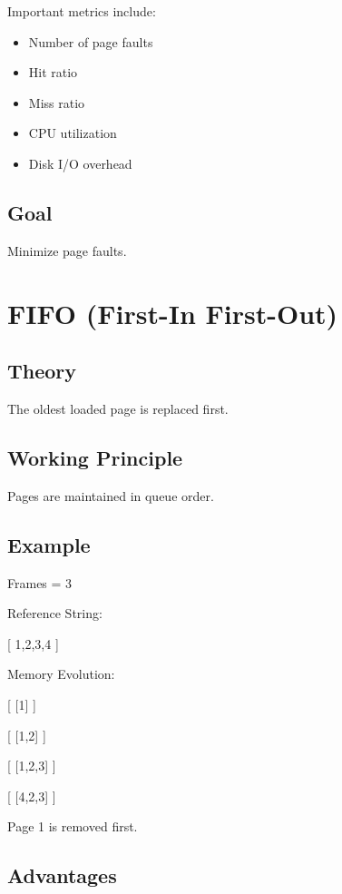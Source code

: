 Important metrics include:

\begin{itemize}
\item Number of page faults
\item Hit ratio
\item Miss ratio
\item CPU utilization
\item Disk I/O overhead
\end{itemize}

\subsection{Goal}

Minimize page faults.

\section{FIFO (First-In First-Out)}

\subsection{Theory}

The oldest loaded page is replaced first.

\subsection{Working Principle}

Pages are maintained in queue order.

\subsection{Example}

Frames = 3

Reference String:

[
1,2,3,4
]

Memory Evolution:

[
[1]
]

[
[1,2]
]

[
[1,2,3]
]

[
[4,2,3]
]

Page 1 is removed first.

\subsection{Advantages}

